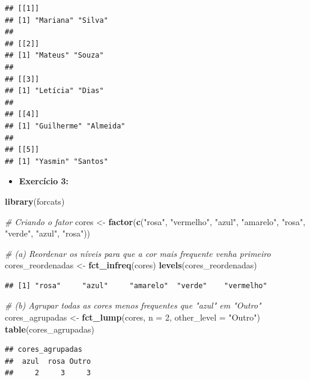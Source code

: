 \documentclass[
]{book}
\newenvironment{Shaded}{\begin{snugshade}}{\end{snugshade}}
\newcommand{\AttributeTok}[1]{\textcolor[rgb]{0.13,0.29,0.53}{#1}}
\newcommand{\CommentTok}[1]{\textcolor[rgb]{0.56,0.35,0.01}{\textit{#1}}}
\newcommand{\DecValTok}[1]{\textcolor[rgb]{0.00,0.00,0.81}{#1}}
\newcommand{\FunctionTok}[1]{\textcolor[rgb]{0.13,0.29,0.53}{\textbf{#1}}}
\newcommand{\NormalTok}[1]{#1}
\newcommand{\OtherTok}[1]{\textcolor[rgb]{0.56,0.35,0.01}{#1}}
\newcommand{\StringTok}[1]{\textcolor[rgb]{0.31,0.60,0.02}{#1}}
\providecommand{\tightlist}{%
  \setlength{\itemsep}{0pt}\setlength{\parskip}{0pt}}
\begin{document}
\begin{verbatim}
## [[1]]
## [1] "Mariana" "Silva"  
## 
## [[2]]
## [1] "Mateus" "Souza" 
## 
## [[3]]
## [1] "Letícia" "Dias"   
## 
## [[4]]
## [1] "Guilherme" "Almeida"  
## 
## [[5]]
## [1] "Yasmin" "Santos"
\end{verbatim}

\begin{itemize}
\tightlist
\item
  \textbf{Exercício 3:}
\end{itemize}

\begin{Shaded}
\begin{Highlighting}[]
\FunctionTok{library}\NormalTok{(forcats)}

\CommentTok{\# Criando o fator}
\NormalTok{cores }\OtherTok{\textless{}{-}} \FunctionTok{factor}\NormalTok{(}\FunctionTok{c}\NormalTok{(}\StringTok{"rosa"}\NormalTok{, }\StringTok{"vermelho"}\NormalTok{, }\StringTok{"azul"}\NormalTok{, }\StringTok{"amarelo"}\NormalTok{, }\StringTok{"rosa"}\NormalTok{, }\StringTok{"verde"}\NormalTok{, }\StringTok{"azul"}\NormalTok{, }\StringTok{"rosa"}\NormalTok{))}

\CommentTok{\# (a) Reordenar os níveis para que a cor mais frequente venha primeiro}
\NormalTok{cores\_reordenadas }\OtherTok{\textless{}{-}} \FunctionTok{fct\_infreq}\NormalTok{(cores)}
\FunctionTok{levels}\NormalTok{(cores\_reordenadas)}
\end{Highlighting}
\end{Shaded}

\begin{verbatim}
## [1] "rosa"     "azul"     "amarelo"  "verde"    "vermelho"
\end{verbatim}

\begin{Shaded}
\begin{Highlighting}[]
\CommentTok{\# (b) Agrupar todas as cores menos frequentes que "azul" em "Outro"}
\NormalTok{cores\_agrupadas }\OtherTok{\textless{}{-}} \FunctionTok{fct\_lump}\NormalTok{(cores, }\AttributeTok{n =} \DecValTok{2}\NormalTok{, }\AttributeTok{other\_level =} \StringTok{"Outro"}\NormalTok{)}
\FunctionTok{table}\NormalTok{(cores\_agrupadas)}
\end{Highlighting}
\end{Shaded}

\begin{verbatim}
## cores_agrupadas
##  azul  rosa Outro 
##     2     3     3
\end{verbatim}
\end{document}
